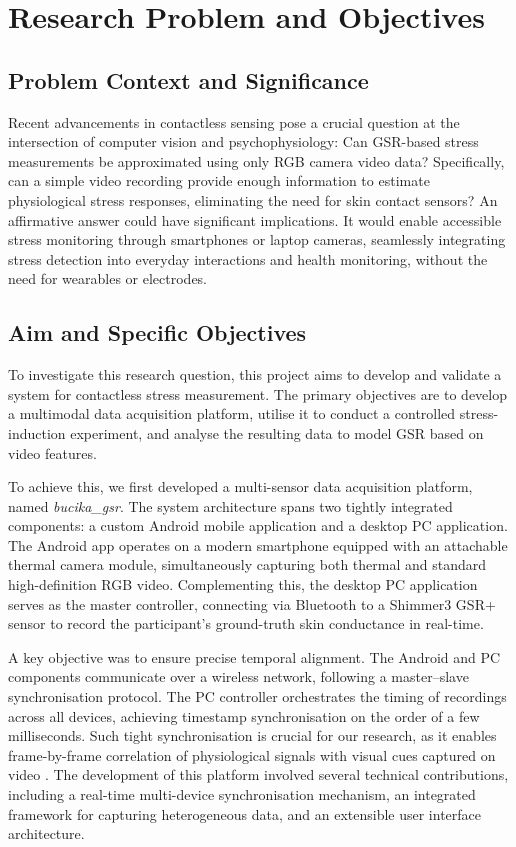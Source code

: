 \documentclass[11pt,a4paper]{report}
\begin{document}
\section{Research Problem and Objectives}

\subsection{Problem Context and Significance}

Recent advancements in contactless sensing pose a crucial question at the
intersection of computer vision and psychophysiology: Can GSR-based stress
measurements be approximated using only RGB camera video data?  Specifically, can a
simple video recording provide enough information to estimate physiological stress
responses, eliminating the need for skin contact sensors?  An affirmative answer
could have significant implications.  It would enable accessible stress monitoring
through smartphones or laptop cameras, seamlessly integrating stress detection into
everyday interactions and health monitoring, without the need for wearables or
electrodes.

\subsection{Aim and Specific Objectives}

To investigate this research question, this project aims to develop and validate a
system for contactless stress measurement.  The primary objectives are to develop a
multimodal data acquisition platform, utilise it to conduct a controlled
stress-induction experiment, and analyse the resulting data to model GSR based on
video features.

To achieve this, we first developed a multi-sensor data acquisition platform, named
\textit{bucika\_gsr}.  The system architecture spans two tightly integrated
components: a custom Android mobile application and a desktop PC application.  The
Android app operates on a modern smartphone equipped with an attachable thermal
camera module, simultaneously capturing both thermal and standard high-definition RGB
video.  Complementing this, the desktop PC application serves as the master
controller, connecting via Bluetooth to a Shimmer3 GSR+ sensor to record the
participant's ground-truth skin conductance in real-time.

A key objective was to ensure precise temporal alignment.  The Android and PC
components communicate over a wireless network, following a master--slave
synchronisation protocol.  The PC controller orchestrates the timing of recordings
across all devices, achieving timestamp synchronisation on the order of a few
milliseconds.  Such tight synchronisation is crucial for our research, as it enables
frame-by-frame correlation of physiological signals with visual cues captured on
video \cite{Gravina2017}.  The development of this platform involved several
technical contributions, including a real-time multi-device synchronisation
mechanism, an integrated framework for capturing heterogeneous data, and an
extensible user interface architecture.
\end{document}
